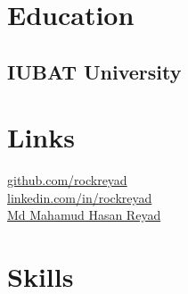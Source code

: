 \documentclass[]{deedy-resume-openfont}
\begin{document}
%
%
\lastupdated

%
%

%
%

\begin{minipage}[t]{0.33\textwidth} 


\section{Education} 

\subsection{IUBAT University}
\sectionsep


\section{Links} 
 \href{https://github.com/rockreyad}{github.com/rockreyad} \href{https://github.com/rockreyad}{} \\
 \href{https://linkedin.com/in/rockreyad}{linkedin.com/in/rockreyad} \href{https://linkedin.com/in/rockreyad}{} \\
 \href{https://facebook.com/rockreyad.bd}{Md Mahamud Hasan Reyad} \href{https://facebook.com/rockreyad.bd}{} \\



\section{Skills}


\end{minipage}
\end{document}
